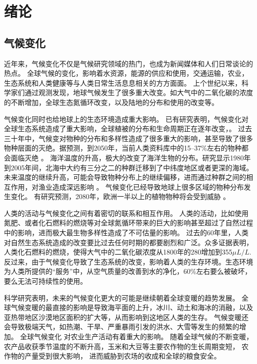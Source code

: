 \chapter{绪论}
\label{cha:intro}

\section{气候变化}

近年来，气候变化不仅是气候研究领域的热门，也成为新闻媒体和人们日常谈论的热点。
全球气候的变化，影响着水资源，能源的供应和使用，交通运输，农业，生态系统和人类健康等与人类日常生活息息相关的方方面面\cite{karl2009global}。
上个世纪以来，科学家们通过观测发现，地球气候发生了很多重大改变。如大气中的二氧化碳的浓度的不断增加，全球生态氮循环改变，以及陆地的分布和使用的改变等\cite{vitousek1994beyond}。


气候变化同时也给地球上的生态环境造成重大影响。
已有研究表明，气候变化对全球生态系统造成了重大影响，全球植被的分布和生命周期正在逐年改变\cite{parmesan2003globally}，。
过去三十年中，气候变对物种的分布和多样性造成了很多重大的影响，甚至导致了很多物种层面的灭绝。据预测，到2050年，当前人类资料库中的15–37\%左右的物种都会面临灭绝 \cite{thomas2004extinction} 。
海洋温度的升高，极大的改变了海洋生物的分布。研究显示1980年到2005年间，北海中大约有三分之二的种群迁移到了中纬度地区或者更深的海域。
未来温度的继续升高，可能会导致物种分布上的继续偏移，进而通过种群之间的相互作用，对渔业造成深远影响\cite{perry2005climate} 。
气候变化已经导致地球上很多区域的物种分布发生变化。 
有研究预测，2080年，欧洲一半以上的植物物种将会受到威胁\cite{thuiller2005climate} 。

 
人类的活动与气候变化之间有着密切的联系和相互作用。
人类的活动，比如使用氮肥、或者化石燃料的燃烧等对全球氮循环带来的巨大的影响甚至超过了自然过程中的影响，进而极大最生物多样性造成了不可估量的影响。
过去的60年里，人类对自然生态系统造成的改变要比过去任何时期的都要剧烈和广泛。众多证据表明，人类化石燃料的燃烧，使得大气中的二氧化碳浓度从1800年的280增加到355$\mu L/L$\cite{vitousek1994beyond}. 
反过来，由于气候变化导致了生态系统的改变，影响着人类的生存环境。生态环境为人类所提供的“服务”中，从空气质量的改善到水的净化，60\%左右要么被破坏，要么无法可持续性的使用\cite{assessment2005ecosystems}。


科学研究表明，未来的气候变化更大的可能是继续朝着全球变暖的趋势发展。
全球气候变暖的最直接的影响是导致海平面的上升，冰川、动土和海冰的消融，以及亚热带地区沙漠地区面积的扩大等，从而影响到这地区人类的生存。
气候变暖还会导致极端天气，如热潮、干旱、严重暴雨引发的洪水、大雪等发生的频繁的增加。
全球气候变化 对农业生产活动有着重大的影响。 随着全球气候的不断变暖，农产品收获季节温度的不断升高，玉米和大豆等主要农作物的生长周期变短， 农作物的产量受到很大影响， 进而威胁到农场的收成和全球的粮食安全\cite{battisti2009historical,adams1990global,smith1989potential}。 


